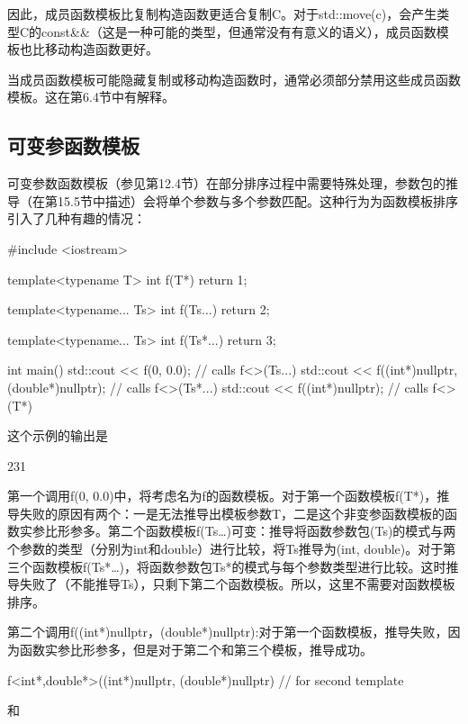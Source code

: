 因此，成员函数模板比复制构造函数更适合复制C。对于std::move(c)，会产生类型C的const\&\&（这是一种可能的类型，但通常没有有意义的语义），成员函数模板也比移动构造函数更好。

当成员函数模板可能隐藏复制或移动构造函数时，通常必须部分禁用这些成员函数模板。这在第6.4节中有解释。

\subsection{可变参函数模板}

可变参数函数模板（参见第12.4节）在部分排序过程中需要特殊处理，参数包的推导（在第15.5节中描述）会将单个参数与多个参数匹配。这种行为为函数模板排序引入了几种有趣的情况：

\begin{cpp}
#include <iostream>

template<typename T>
int f(T*)
{
	return 1;
}

template<typename... Ts>
int f(Ts...)
{
	return 2;
}

template<typename... Ts>
int f(Ts*...)
{
	return 3;
}

int main()
{
	std::cout << f(0, 0.0); // calls f<>(Ts...)
	std::cout << f((int*)nullptr, (double*)nullptr); // calls f<>(Ts*...)
	std::cout << f((int*)nullptr); // calls f<>(T*)
}
\end{cpp}

这个示例的输出是

\begin{shell}
231
\end{shell}

第一个调用f(0, 0.0)中，将考虑名为f的函数模板。对于第一个函数模板f(T*)，推导失败的原因有两个：一是无法推导出模板参数T，二是这个非变参函数模板的函数实参比形参多。第二个函数模板f(Ts…)可变：推导将函数参数包(Ts)的模式与两个参数的类型（分别为int和double）进行比较，将Ts推导为(int, double)。对于第三个函数模板f(Ts*…)，将函数参数包Ts*的模式与每个参数类型进行比较。这时推导失败了（不能推导Ts），只剩下第二个函数模板。所以，这里不需要对函数模板排序。

第二个调用f((int*)nullptr，(double*)nullptr):对于第一个函数模板，推导失败，因为函数实参比形参多，但是对于第二个和第三个模板，推导成功。

\begin{cpp}
f<int*,double*>((int*)nullptr, (double*)nullptr) // for second template
\end{cpp}

和

